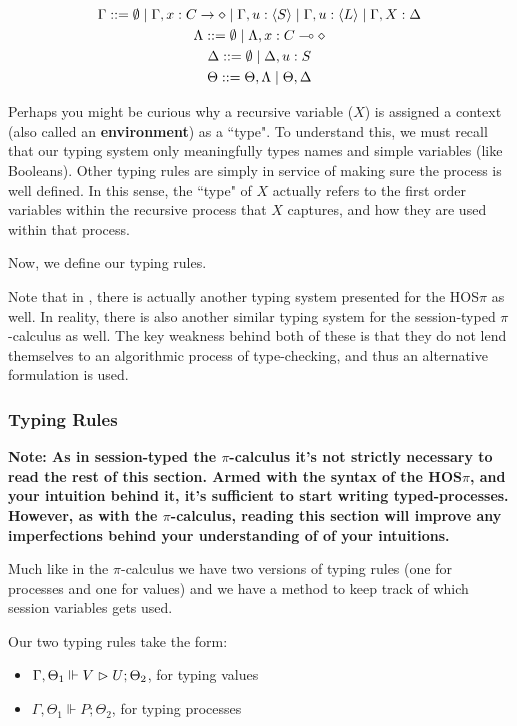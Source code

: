 \begin{gather*}
\Gamma ::= \emptyset \mid \Gamma, x : C \rightarrow \diamond \mid \Gamma, u : \langle S \rangle \mid \Gamma, u : \langle L \rangle \mid \Gamma, X : \Delta \\
\Lambda ::= \emptyset \mid \Lambda, x : C \multimap \diamond \\
\Delta ::= \emptyset \mid \Delta, u : S \\
\Theta ::= \Theta,\Lambda \mid \Theta,\Delta
\end{gather*}

Perhaps you might be curious why a recursive variable ($X$) is assigned a context (also called an \textbf{environment}) as a ``type". To understand this, we must recall that our typing system only meaningfully types names and simple variables (like Booleans). Other typing rules are simply in service of making sure the process is well defined. In this sense, the ``type" of $X$ actually refers to the first order variables within the recursive process that $X$ captures, and how they are used within that process.

Now, we define our typing rules.

Note that in \cite{main}, there is actually another typing system presented for the HOS$\pi$ as well. In reality, there is also another similar typing system for the session-typed $\pi$-calculus as well. The key weakness behind both of these is that they do not lend themselves to an algorithmic process of type-checking, and thus an alternative formulation is used. 

\subsubsection{Typing Rules}

\textbf{Note: As in session-typed the $\pi$-calculus it's not strictly necessary to read the rest of this section. Armed with the syntax of the HOS$\pi$, and your intuition behind it, it's sufficient to start writing typed-processes. However, as with the $\pi$-calculus, reading this section will improve any imperfections behind your understanding of of your intuitions.}

Much like in the $\pi$-calculus we have two versions of typing rules (one for processes and one for values) and we have a method to keep track of which session variables gets used.

Our two typing rules take the form:
\begin{itemize}
\item $\Gamma, \Theta_1 \Vdash V \vartriangleright U ; \Theta_2$, for typing values
\item $\Gamma, \Theta_1 \Vdash P ; \Theta_2$, for typing processes
\end{itemize}

